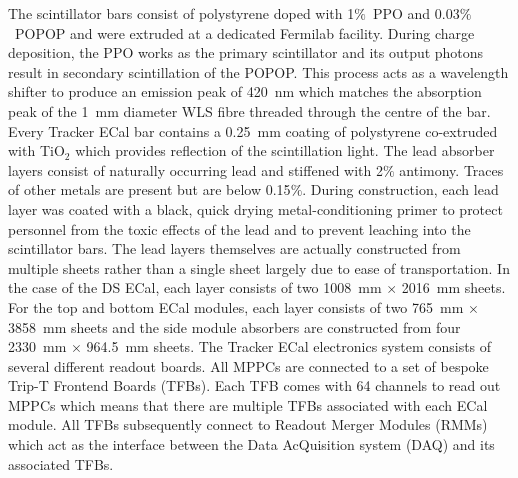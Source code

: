 \newline
\newline
The scintillator bars consist of polystyrene doped with 1$\%$~PPO and 0.03$\%$~POPOP and were extruded at a dedicated Fermilab facility.  During charge deposition, the PPO works as the primary scintillator and its output photons result in secondary scintillation of the POPOP.  This process acts as a wavelength shifter to produce an emission peak of 420~nm which matches the absorption peak of the 1~mm diameter WLS fibre threaded through the centre of the bar.  Every Tracker ECal bar contains a 0.25~mm coating of polystyrene co-extruded with TiO$_2$ which provides reflection of the scintillation light.
\newline
\newline
The lead absorber layers consist of naturally occurring lead and stiffened with 2$\%$ antimony.  Traces of other metals are present but are below 0.15$\%$.  During construction, each lead layer was coated with a black, quick drying metal-conditioning primer to protect personnel from the toxic effects of the lead and to prevent leaching into the scintillator bars.  The lead layers themselves are actually constructed from multiple sheets rather than a single sheet largely due to ease of transportation.  In the case of the DS ECal, each layer consists of two 1008~mm $\times$ 2016~mm sheets.  For the top and bottom ECal modules, each layer consists of two 765~mm $\times$ 3858~mm sheets and the side module absorbers are constructed from four 2330~mm $\times$ 964.5~mm sheets.
\newline
\newline
The Tracker ECal electronics system consists of several different readout boards.  All MPPCs are connected to a set of bespoke Trip-T\cite{Estrada:2003fh} Frontend Boards (TFBs).  Each TFB comes with 64 channels to read out MPPCs which means that there are multiple TFBs associated with each ECal module.  All TFBs subsequently connect to Readout Merger Modules (RMMs) which act as the interface between the Data AcQuisition system (DAQ) and its associated TFBs.
\newline
\newline
{}
